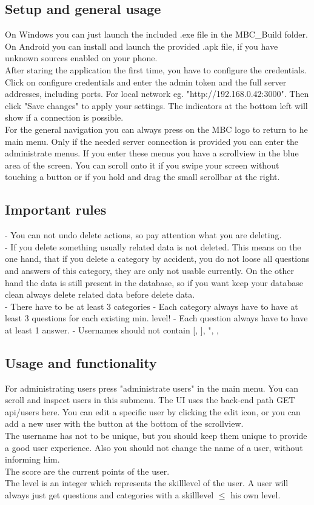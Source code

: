 \subsection{Setup and general usage}
On Windows you can just launch the included .exe file in the MBC\_Build folder. On Android you can install and launch the provided .apk file, if you have unknown sources enabled on your phone. \\
After staring the application the first time, you have to configure the credentials. 
Click on configure credentials and enter the admin token and the full server addresses, including ports. For local network eg. "http://192.168.0.42:3000". Then click "Save changes" to apply your settings. The indicators at the bottom left will show if a connection is possible.\\
For the general navigation you can always press on the MBC logo to return to he main menu. Only if the needed server connection is provided you can enter the administrate menus.
If you enter these menus you have a scrollview in the blue area of the screen. You can scroll onto it if you swipe your screen without touching a button or if you hold and drag the small scrollbar at the right.

\subsection{Important rules}
- You can not undo delete actions, so pay attention what you are deleting.\\
- If you delete something usually related data is not deleted. This means on the one hand, that if you delete a category by accident, you do not loose all questions and answers of this category, they are only not usable currently. On the other hand the data is still present in the database, so if you want keep your database clean always delete related data before delete data.\\
- There have to be at least 3 categories
- Each category always have to have at least 3 questions for each existing min. level!
- Each question always have to have at least 1 answer.
- Usernames should not contain [, ], ", {, }

\subsection{Usage and functionality}
For administrating users press "administrate users" in the main menu. You can scroll and inspect users in this submenu. The UI uses the back-end path GET api/users here. You can edit a specific user by clicking the edit icon, or you can add a new user with the button at the bottom of the scrollview.\\
The username has not to be unique, but you should keep them unique to provide a good user experience. Also you should not change the name of a user, without informing him.\\
The score are the current points of the user.\\
The level is an integer which represents the skilllevel of the user. A user will always just get questions and categories with a skilllevel $\leq$ his own level.\\

